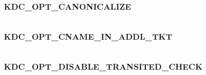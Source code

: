 \documentclass[letterpaper,10pt,english]{sphinxmanual}
\begin{document}
\subsubsection{KDC\_OPT\_CANONICALIZE}
\label{appdev/refs/macros/KDC_OPT_CANONICALIZE:kdc-opt-canonicalize}\label{appdev/refs/macros/KDC_OPT_CANONICALIZE:kdc-opt-canonicalize-data}\label{appdev/refs/macros/KDC_OPT_CANONICALIZE::doc}

\begin{fulllineitems}
\label{appdev/refs/macros/KDC_OPT_CANONICALIZE:KDC_OPT_CANONICALIZE}
\end{fulllineitems}


\begin{tabulary}{\linewidth}{|L|L|}
\hline

 & 
\\\hline
\end{tabulary}



\subsubsection{KDC\_OPT\_CNAME\_IN\_ADDL\_TKT}
\label{appdev/refs/macros/KDC_OPT_CNAME_IN_ADDL_TKT:kdc-opt-cname-in-addl-tkt-data}\label{appdev/refs/macros/KDC_OPT_CNAME_IN_ADDL_TKT:kdc-opt-cname-in-addl-tkt}\label{appdev/refs/macros/KDC_OPT_CNAME_IN_ADDL_TKT::doc}

\begin{fulllineitems}
\label{appdev/refs/macros/KDC_OPT_CNAME_IN_ADDL_TKT:KDC_OPT_CNAME_IN_ADDL_TKT}
\end{fulllineitems}


\begin{tabulary}{\linewidth}{|L|L|}
\hline

 & 
\\\hline
\end{tabulary}



\subsubsection{KDC\_OPT\_DISABLE\_TRANSITED\_CHECK}
\label{appdev/refs/macros/KDC_OPT_DISABLE_TRANSITED_CHECK:kdc-opt-disable-transited-check}\label{appdev/refs/macros/KDC_OPT_DISABLE_TRANSITED_CHECK::doc}\label{appdev/refs/macros/KDC_OPT_DISABLE_TRANSITED_CHECK:kdc-opt-disable-transited-check-data}
\end{document}
